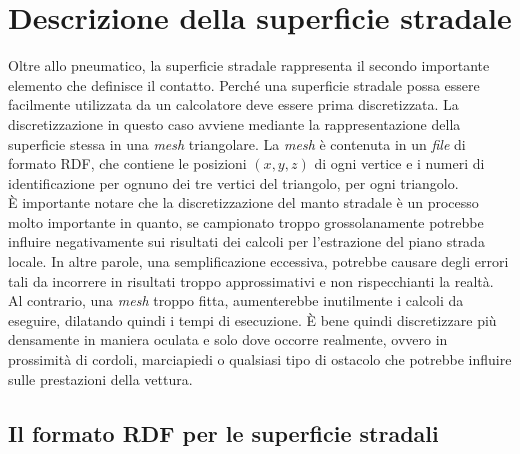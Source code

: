 \chapter{Descrizione della superficie stradale}
\label{rdf}
%
Oltre allo pneumatico, la superficie stradale rappresenta il secondo importante elemento che definisce il contatto. Perché una superficie stradale possa essere facilmente utilizzata da un calcolatore deve essere prima discretizzata. La discretizzazione in questo caso avviene mediante la rappresentazione della superficie stessa in una \textit{mesh} triangolare. La \textit{mesh} è contenuta in un \textit{file} di formato \ac{RDF}, che contiene le posizioni $(x,y,z)$ di ogni vertice e i numeri di identificazione per ognuno dei tre vertici del triangolo, per ogni triangolo.\\
\indent
È importante notare che la discretizzazione del manto stradale è un processo molto importante in quanto, se campionato troppo grossolanamente potrebbe influire negativamente sui risultati dei calcoli per l'estrazione del piano strada locale. In altre parole, una semplificazione eccessiva, potrebbe causare degli errori tali da incorrere in risultati troppo approssimativi e non rispecchianti la realtà. Al contrario, una \textit{mesh} troppo fitta, aumenterebbe inutilmente i calcoli da eseguire, dilatando quindi i tempi di esecuzione. È bene quindi discretizzare più densamente in maniera oculata e solo dove occorre realmente, ovvero in prossimità di cordoli, marciapiedi o qualsiasi tipo di ostacolo che potrebbe influire sulle prestazioni della vettura.

\section{Il formato RDF per le superficie stradali}
%

